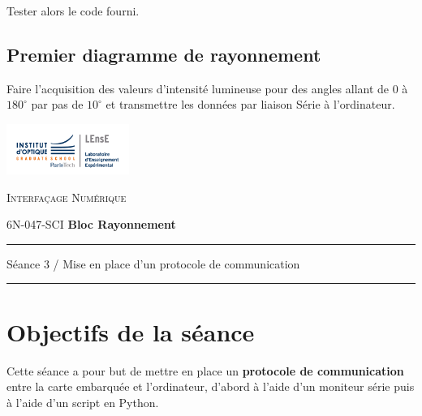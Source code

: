 \documentclass[a4paper,11pt,titlepage]{article} %
\begin{document}
\Manip Tester alors le code fourni.

\subsection{Premier diagramme de rayonnement}


\Manip Faire l'acquisition des valeurs d'intensité lumineuse pour des angles allant de $0$ à $180^\circ{}$ par pas de $10^\circ{}$ et transmettre les données par liaison Série à l'ordinateur.


\cleardoublepage
\strut %

\begin{minipage}[c]{.25\linewidth}
	\includegraphics[width=4cm]{images/Logo-LEnsE.png}
\end{minipage} \hfill
\begin{minipage}[c]{.4\linewidth}

\begin{center}
\vspace{0.3cm}
{\Large \textsc{Interfaçage Numérique}}

\medskip

6N-047-SCI \qquad \textbf{\large Bloc Rayonnement}

\end{center}
\end{minipage}\hfill

\vspace{0.5cm}

\noindent \rule{\linewidth}{1pt}

{\noindent\Large \rule[-7pt]{0pt}{30pt} Séance 3 / Mise en place d'un protocole de communication} 

\noindent \rule{\linewidth}{1pt}


\section{Objectifs de la séance}

Cette séance a pour but de mettre en place un \textbf{protocole de communication} entre la carte embarquée et l'ordinateur, d'abord à l'aide d'un moniteur série puis à l'aide d'un script en Python.
\end{document}
